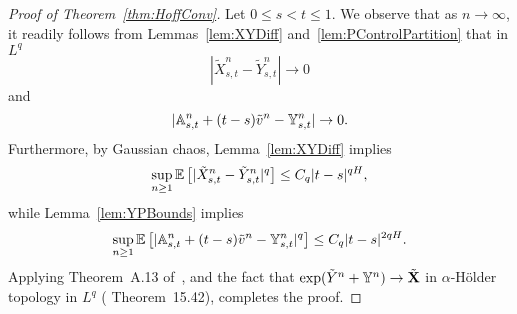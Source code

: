 \documentclass{article}
\begin{document}
\begin{proof}[Proof of Theorem~\ref{thm:HoffConv}]
Let $0 \leq s < t \leq 1$. We observe that as $n \rightarrow \infty$, it readily follows from Lemmas~\ref{lem:XYDiff} and~\ref{lem:PControlPartition} that in $L^q$
\[
|\tilde X^n_{s,t} - \tilde Y^n_{s,t}| \rightarrow 0
\]
and
\[
|\mathbb A^n_{s,t} + (t-s)\tilde v^n - \mathbb Y^n_{s,t}| \rightarrow 0.
\]
Furthermore, by Gaussian chaos, Lemma~\ref{lem:XYDiff} implies
\[
\sup_{n \geq 1} \mathbb E \left[ |\tilde X^n_{s,t} - \tilde Y^n_{s,t}|^q \right] \leq C_q |t-s|^{qH},
\]
while Lemma~\ref{lem:YPBounds} implies
\[
\sup_{n \geq 1} \mathbb E \left[ |\mathbb A^n_{s,t} + (t-s)\tilde v^n - \mathbb Y^n_{s,t}|^q \right] \leq C_q |t-s|^{2qH}.
\]
Applying Theorem~A.13 of~\cite{FrizVictoir10}, and the fact that $\exp(\tilde Y^n + \mathbb Y^n) \rightarrow \tilde {\mathbf X}$ in $\alpha$-H{\"o}lder topology in $L^q$ (\cite{FrizVictoir10} Theorem~15.42), completes the proof.
\end{proof}




\end{document}
